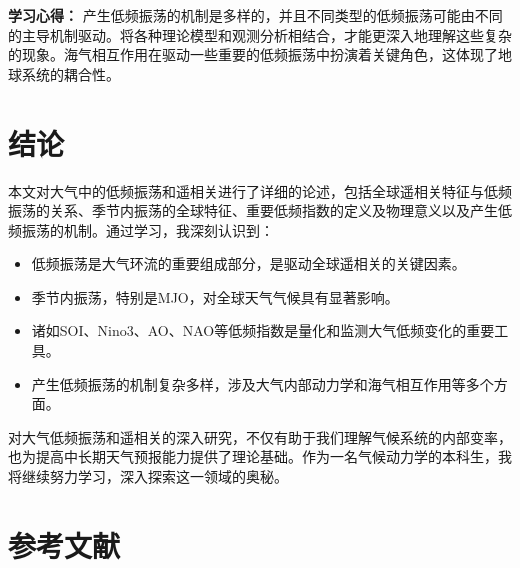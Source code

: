 \documentclass[10pt,hyperref,a4paper,UTF8]{ctexart}
\begin{document}
\textbf{学习心得：} 产生低频振荡的机制是多样的，并且不同类型的低频振荡可能由不同的主导机制驱动。将各种理论模型和观测分析相结合，才能更深入地理解这些复杂的现象。海气相互作用在驱动一些重要的低频振荡中扮演着关键角色，这体现了地球系统的耦合性。

\section{结论}

本文对大气中的低频振荡和遥相关进行了详细的论述，包括全球遥相关特征与低频振荡的关系、季节内振荡的全球特征、重要低频指数的定义及物理意义以及产生低频振荡的机制。通过学习，我深刻认识到：

\begin{itemize}
    \item 低频振荡是大气环流的重要组成部分，是驱动全球遥相关的关键因素。
    \item 季节内振荡，特别是MJO，对全球天气气候具有显著影响。
    \item 诸如SOI、Nino3、AO、NAO等低频指数是量化和监测大气低频变化的重要工具。
    \item 产生低频振荡的机制复杂多样，涉及大气内部动力学和海气相互作用等多个方面。
\end{itemize}

对大气低频振荡和遥相关的深入研究，不仅有助于我们理解气候系统的内部变率，也为提高中长期天气预报能力提供了理论基础。作为一名气候动力学的本科生，我将继续努力学习，深入探索这一领域的奥秘。

\section{参考文献}
\end{document}
